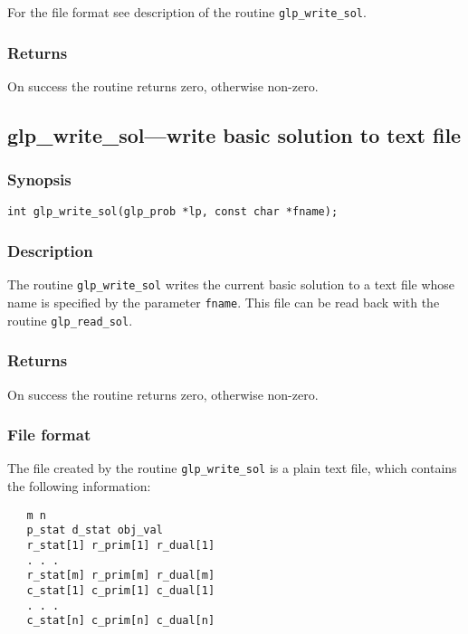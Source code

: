 For the file format see description of the routine \verb|glp_write_sol|.

\subsubsection*{Returns}

On success the routine returns zero, otherwise non-zero.

\subsection{glp\_write\_sol---write basic solution to text file}

\subsubsection*{Synopsis}

\begin{verbatim}
int glp_write_sol(glp_prob *lp, const char *fname);
\end{verbatim}

\subsubsection*{Description}

The routine \verb|glp_write_sol| writes the current basic solution to a
text file whose name is specified by the parameter \verb|fname|. This
file can be read back with the routine \verb|glp_read_sol|.

\subsubsection*{Returns}

On success the routine returns zero, otherwise non-zero.

\subsubsection*{File format}

The file created by the routine \verb|glp_write_sol| is a plain text
file, which contains the following information:

\begin{verbatim}
   m n
   p_stat d_stat obj_val
   r_stat[1] r_prim[1] r_dual[1]
   . . .
   r_stat[m] r_prim[m] r_dual[m]
   c_stat[1] c_prim[1] c_dual[1]
   . . .
   c_stat[n] c_prim[n] c_dual[n]
\end{verbatim}

